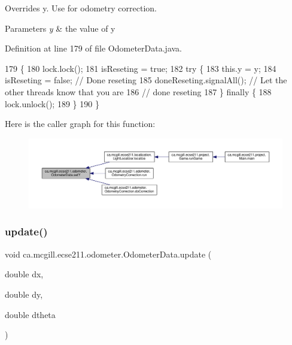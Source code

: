 Overrides y. Use for odometry correction.


\begin{DoxyParams}{Parameters}
{\em y} & the value of y \\
\hline
\end{DoxyParams}


Definition at line 179 of file Odometer\+Data.\+java.


\begin{DoxyCode}
179                              \{
180     lock.lock();
181     isReseting = \textcolor{keyword}{true};
182     \textcolor{keywordflow}{try} \{
183       this.y = y;
184       isReseting = \textcolor{keyword}{false}; \textcolor{comment}{// Done reseting}
185       doneReseting.signalAll(); \textcolor{comment}{// Let the other threads know that you are}
186                                 \textcolor{comment}{// done reseting}
187     \} \textcolor{keywordflow}{finally} \{
188       lock.unlock();
189     \}
190   \}
\end{DoxyCode}
Here is the caller graph for this function\+:
\nopagebreak
\begin{figure}[H]
\begin{center}
\leavevmode
\includegraphics[width=350pt]{classca_1_1mcgill_1_1ecse211_1_1odometer_1_1_odometer_data_a82986438cd462e66520bc62bb4bd2b75_icgraph}
\end{center}
\end{figure}
\mbox{\label{classca_1_1mcgill_1_1ecse211_1_1odometer_1_1_odometer_data_aaa06f190d634299fcb1b97a1891dad85}} 
\subsubsection{\texorpdfstring{update()}{update()}}
{\footnotesize\ttfamily void ca.\+mcgill.\+ecse211.\+odometer.\+Odometer\+Data.\+update (\begin{DoxyParamCaption}\item[{double}]{dx,  }\item[{double}]{dy,  }\item[{double}]{dtheta }\end{DoxyParamCaption})}

